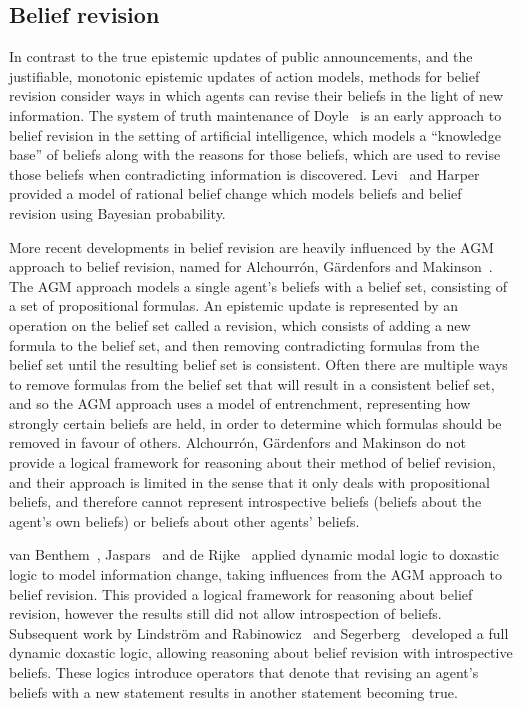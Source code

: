\subsection{Belief revision}

In contrast to the true epistemic updates of public announcements, and the justifiable, monotonic epistemic updates of action models, methods for belief revision consider ways in which agents can revise their beliefs in the light of new information.
The system of truth maintenance of Doyle~\cite{doyle:1979} is an early approach to belief revision in the setting of artificial intelligence, which models a ``knowledge base'' of beliefs along with the reasons for those beliefs, which are used to revise those beliefs when contradicting information is discovered. 
Levi~\cite{levi:1983} and Harper~\cite{harper:1976} provided a model of rational belief change which models beliefs and belief revision using Bayesian probability.

More recent developments in belief revision are heavily influenced by the AGM approach to belief revision, named for Alchourr{\'o}n, G{\"a}rdenfors and Makinson~\cite{alchourron:1985}.
The AGM approach models a single agent's beliefs with a belief set, consisting of a set of propositional formulas.
An epistemic update is represented by an operation on the belief set called a revision, which consists of adding a new formula to the belief set, and then removing contradicting formulas from the belief set until the resulting belief set is consistent.
Often there are multiple ways to remove formulas from the belief set that will result in a consistent belief set, and so the AGM approach uses a model of entrenchment, representing how strongly certain beliefs are held, in order to determine which formulas should be removed in favour of others.
Alchourr{\'o}n, G{\"a}rdenfors and Makinson do not provide a logical framework for reasoning about their method of belief revision, and their approach is limited in the sense that it only deals with propositional beliefs, and therefore cannot represent introspective beliefs (beliefs about the agent's own beliefs) or beliefs about other agents' beliefs. 

van Benthem~\cite{vanbenthem:1989, vanbenthem:1994, vanbenthem:1996}, Jaspars~\cite{jaspars:1994} and de Rijke~\cite{derijke:1994} applied dynamic modal logic to doxastic logic to model information change, taking influences from the AGM approach to belief revision.
This provided a logical framework for reasoning about belief revision, however the results still did not allow introspection of beliefs. 
Subsequent work by Lindstr{\"o}m and Rabinowicz~\cite{lindstrom:1999a, lindstrom:1999b} and Segerberg~\cite{segerberg:1999a, segerberg:1999b} developed a full dynamic doxastic logic, allowing reasoning about belief revision with introspective beliefs.
These logics introduce operators that denote that revising an agent's beliefs with a new statement results in another statement becoming true.

